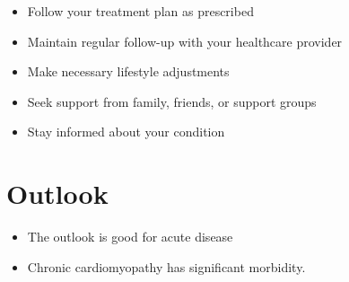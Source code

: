 \begin{itemize}[noitemsep]
  \item Follow your treatment plan as prescribed
  \item Maintain regular follow-up with your healthcare provider
  \item Make necessary lifestyle adjustments
  \item Seek support from family, friends, or support groups
  \item Stay informed about your condition
\end{itemize}
\section{Outlook}
\begin{itemize}[noitemsep]
  \item The outlook is good for acute disease
  \item Chronic cardiomyopathy has significant morbidity.
\end{itemize}
